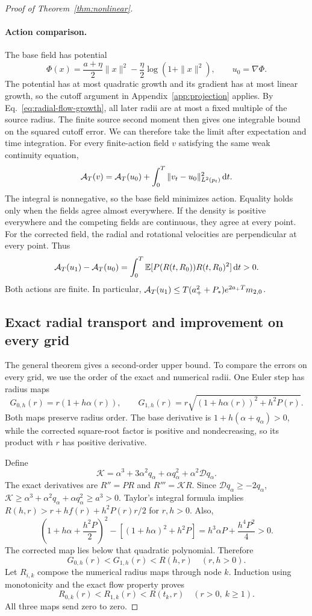 \begin{proof}[Proof of Theorem~\ref{thm:nonlinear}]
\paragraph{Action comparison.}
The base field has potential
\[
 \Phi(x)=\frac{a+\eta}{2}\|x\|^2-\frac\eta2\log(1+\|x\|^2),
 \qquad u_0=\nabla\Phi.
\]
The potential has at most quadratic growth and its gradient has at most linear growth, so the cutoff argument in Appendix~\ref{app:projection} applies. By Eq.~\eqref{eq:radial-flow-growth}, all later radii are at most a fixed multiple of the source radius. The finite source second moment then gives one integrable bound on the squared cutoff error. We can therefore take the limit after expectation and time integration. For every finite-action field $v$ satisfying the same weak continuity equation,
\[
 \mathcal A_T(v)=\mathcal A_T(u_0)+\int_0^T\|v_t-u_0\|_{L^2(p_t)}^2\,\mathrm d t.
\]
The integral is nonnegative, so the base field minimizes action. Equality holds only when the fields agree almost everywhere. If the density is positive everywhere and the competing fields are continuous, they agree at every point. For the corrected field, the radial and rotational velocities are perpendicular at every point. Thus
\begin{equation}
 \mathcal A_T(u_1)-\mathcal A_T(u_0)=\int_0^T\mathbb E[P(R(t,R_0))R(t,R_0)^2]\,\mathrm d t>0.
 \label{eq:nonlinear-action-full}
\end{equation}
Both actions are finite. In particular, $\mathcal A_T(u_1)\le T(a_+^2+P_*)e^{2a_+T}m_{2,0}$.


\subsection{Exact radial transport and improvement on every grid}

The general theorem gives a second-order upper bound. To compare the errors on every grid, we use the order of the exact and numerical radii. One Euler step has radius maps
\[
 G_{0,h}(r)=r(1+h\alpha(r)),\qquad
 G_{1,h}(r)=r\sqrt{(1+h\alpha(r))^2+h^2P(r)}.
\]
Both maps preserve radius order. The base derivative is $1+h(\alpha+q_\alpha)>0$, while the corrected square-root factor is positive and nondecreasing, so its product with $r$ has positive derivative.

Define
\[
 \mathcal K=\alpha^3+3\alpha^2q_\alpha+\alpha q_\alpha^2+\alpha^2\mathcal D q_\alpha.
\]
The exact derivatives are $R''=PR$ and $R'''=\mathcal K R$. Since $\mathcal D q_\alpha\ge-2q_\alpha$,
$\mathcal K\ge\alpha^3+\alpha^2q_\alpha+\alpha q_\alpha^2\ge a^3>0$.
Taylor's integral formula implies $R(h,r)>r+hf(r)+h^2P(r)r/2$ for $r,h>0$. Also,
\[
 \left(1+h\alpha+\frac{h^2P}{2}\right)^2
 -[(1+h\alpha)^2+h^2P]=h^3\alpha P+\frac{h^4P^2}{4}>0.
\]
The corrected map lies below that quadratic polynomial. Therefore
\begin{equation}
 G_{0,h}(r)<G_{1,h}(r)<R(h,r)\quad(r,h>0).
 \label{eq:nonlinear-step-order}
\end{equation}
Let $R_{i,k}$ compose the numerical radius maps through node $k$. Induction using monotonicity and the exact flow property proves
\[
 R_{0,k}(r)<R_{1,k}(r)<R(t_k,r)\quad(r>0,\ k\ge1).
\]
All three maps send zero to zero.


\end{proof}
